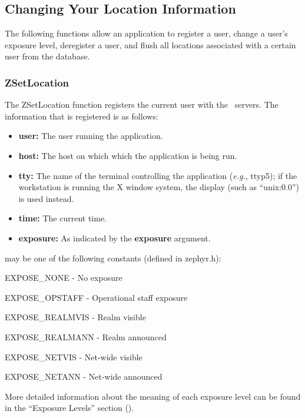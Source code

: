 %
\subsection{Changing Your Location Information}
\label{changing-location}

The following functions allow an application to register a user,
change a user's exposure level, deregister a user, and flush all
locations associated with a certain user from the database.

\subsubsection{ZSetLocation}
\label{ZSetLocation}

\etemplate
{}

The ZSetLocation function registers the current user with the \Zephyr\
servers.  The information that is registered is as follows:

\begin{itemize}
\item {\bf user:} The user running the application.
\item {\bf host:} The host on which which the application is being
run.
\item {\bf tty:} The name of the terminal controlling the
application ({\it e.g.\/}, ttyp5); if the workstation is running
the X window system, the display (such as ``unix:0.0'') is used
instead.
\item {\bf time:} The current time.
\item {\bf exposure:} As indicated by the {\bf exposure} argument.
\end{itemize}

 may be one of the following constants (defined in
zephyr.h):

\begin{list}{}{}
\item EXPOSE_NONE - No exposure
\item EXPOSE_OPSTAFF - Operational staff exposure
\item EXPOSE_REALMVIS - Realm visible
\item EXPOSE_REALMANN - Realm announced
\item EXPOSE_NETVIS - Net-wide visible
\item EXPOSE_NETANN - Net-wide announced
\end{list}
More detailed information about the meaning of each exposure level can
be found in the ``Exposure Levels'' section (\myref{user-location}).

